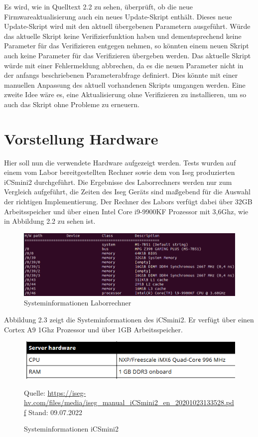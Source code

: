 \documentclass[thesis=bachelor,faculty=cb]{hsmw-thesis}
\begin{document}
\newpage
Es wird, wie in Quelltext 2.2 zu sehen, überprüft, ob die neue Firmwareaktualisierung auch ein neues Update-Skript enthält. Dieses neue Update-Skript wird mit den aktuell übergebenen Parametern ausgeführt. Würde das aktuelle Skript keine Verifizierfunktion haben und dementsprechend keine Parameter für das Verifizieren entgegen nehmen, so könnten einem neuen Skript auch keine Parameter für das Verifizieren übergeben werden. Das aktuelle Skript würde mit einer Fehlermeldung abbrechen, da es die neuen Parameter nicht in der anfangs beschriebenen Parameterabfrage definiert. Dies könnte mit einer manuellen Anpassung des aktuell vorhandenen Skripts umgangen werden. Eine zweite Idee wäre es, eine Aktualisierung ohne Verifizieren zu installieren, um so auch das Skript ohne Probleme zu erneuern. 
\section{Vorstellung Hardware}
Hier soll nun die verwendete Hardware aufgezeigt werden. Tests wurden auf einem vom Labor bereitgestellten Rechner sowie dem von Iseg produzierten iCSmini2 durchgeführt. Die Ergebnisse des Laborrechners werden nur zum Vergleich aufgeführt, die Zeiten des Iseg Geräts sind maßgebend für die Auswahl der richtigen Implementierung. Der Rechner des Labors verfügt dabei über 32GB Arbeitsspeicher und über einen Intel Core i9-9900KF Prozessor mit 3,6Ghz, wie in Abbildung 2.2 zu sehen ist.
\begin{figure}[H]
	\centering
	\includegraphics[scale=0.6]{images/Uni_Prozessor.PNG}
	\caption{Systeminformationen Laborrechner}
\end{figure}
Abbildung 2.3 zeigt die Systeminformationen des iCSmini2. Er verfügt über einen Cortex A9 1Ghz Prozessor und über 1GB Arbeitsspeicher.
\begin{figure}[H]
	\centering
	\includegraphics[scale=0.8]{images/Iseg_Prozessor.PNG}
	\caption{Systeminformationen iCSmini2}{Quelle: \url{https://iseg-hv.com/files/media/iseg_manual_iCSmini2_en_20201023133528.pdf} Stand: 09.07.2022}
\end{figure}
\end{document}

